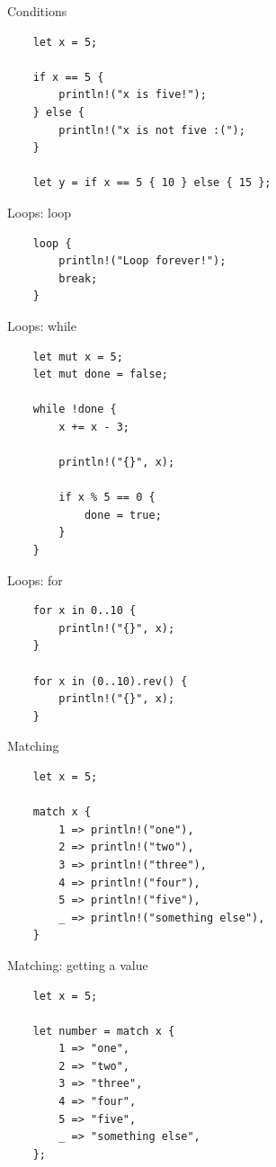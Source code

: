 \documentclass[12pt, aspectratio=169]{beamer}
\begin{document}
\begin{frame}[fragile]{Conditions}
  \begin{verbatim}
    let x = 5;

    if x == 5 {
        println!("x is five!");
    } else {
        println!("x is not five :(");
    }

    let y = if x == 5 { 10 } else { 15 };
  \end{verbatim}
\end{frame}

\begin{frame}[fragile]{Loops: loop}
  \begin{verbatim}
    loop {
        println!("Loop forever!");
        break;
    }
  \end{verbatim}
\end{frame}

\begin{frame}[fragile]{Loops: while}
  \begin{verbatim}
    let mut x = 5;
    let mut done = false;

    while !done {
        x += x - 3;

        println!("{}", x);

        if x % 5 == 0 {
            done = true;
        }
    }
  \end{verbatim}
\end{frame}

\begin{frame}[fragile]{Loops: for}
  \begin{verbatim}
    for x in 0..10 {
        println!("{}", x);
    }

    for x in (0..10).rev() {
        println!("{}", x);
    }
  \end{verbatim}
\end{frame}

\begin{frame}[fragile]{Matching}
  \begin{verbatim}
    let x = 5;

    match x {
        1 => println!("one"),
        2 => println!("two"),
        3 => println!("three"),
        4 => println!("four"),
        5 => println!("five"),
        _ => println!("something else"),
    }
  \end{verbatim}
\end{frame}

\begin{frame}[fragile]{Matching: getting a value}
  \begin{verbatim}
    let x = 5;

    let number = match x {
        1 => "one",
        2 => "two",
        3 => "three",
        4 => "four",
        5 => "five",
        _ => "something else",
    };
  \end{verbatim}
\end{frame}
\end{document}
